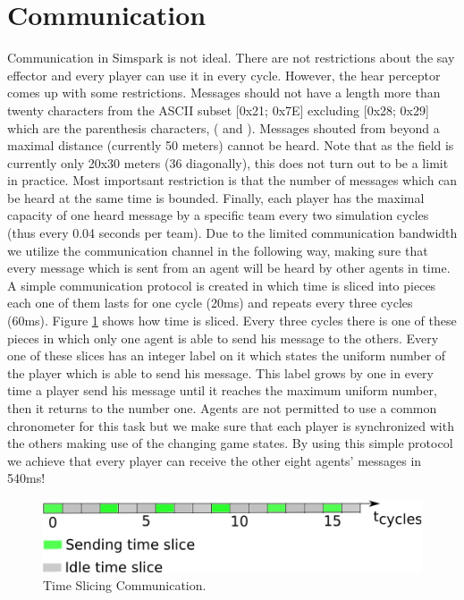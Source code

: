 \section{Communication}
Communication in Simspark is not ideal. There are not restrictions about the say effector and every player can use it in every cycle. However, the hear perceptor comes up with some restrictions. Messages should not have a length more than twenty characters from the ASCII subset [0x21; 0x7E] excluding [0x28; 0x29] which are the parenthesis characters, ( and ). Messages shouted from beyond a maximal distance (currently 50 meters) cannot be heard. Note that as the field is currently only 20x30 meters (36 diagonally), this does not turn out to be a limit in practice. Most importsant restriction is that the number of messages which can be heard at the same time is bounded. Finally, each player has the maximal capacity of one heard message by a specific team every two simulation cycles (thus every 0.04 seconds per team). Due to the limited communication bandwidth we utilize the communication channel in the following way, making sure that every message which is sent from an agent will be heard by other agents in time. A simple communication protocol is created in which time is sliced into pieces each one of them lasts for one cycle (20ms) and repeats every three cycles (60ms). Figure \ref{fig:TimeSlicing} shows how time is sliced. Every three cycles there is one of these pieces in which only one agent is able to send his message to the others. Every one of these slices has an integer label on it which states the uniform number of the player which is able to send his message. This label grows by one in every time a player send his message until it reaches the maximum uniform number, then it returns to the number one. Agents are not permitted to use a common chronometer for this task but we make sure that each player is synchronized with the others making use of the changing game states. By using this simple protocol we achieve that every player can receive the other eight agents' messages in 540ms!
\begin{figure}[!h]
\centering
  \includegraphics[scale=0.7]{Chapter3/figures/MAC.pdf}  
  \caption{Time Slicing Communication.}
  \label{fig:TimeSlicing}
\end{figure} 


